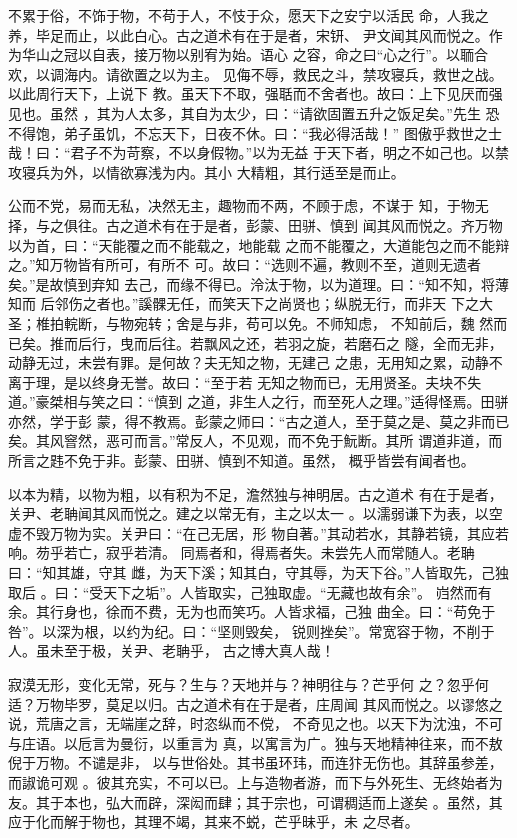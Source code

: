 \documentclass[]{article}
\begin{document}
不累于俗，不饰于物，不苟于人，不忮于众，愿天下之安宁以活民
命，人我之养，毕足而止，以此白心。古之道术有在于是者，宋钘、
尹文闻其风而悦之。作为华山之冠以自表，接万物以别宥为始。语心
之容，命之曰``心之行''。以聏合欢，以调海内。请欲置之以为主。
见侮不辱，救民之斗，禁攻寝兵，救世之战。以此周行天下，上说下
教。虽天下不取，强聒而不舍者也。故曰：上下见厌而强见也。虽然
，其为人太多，其自为太少，曰：``请欲固置五升之饭足矣。''先生
恐不得饱，弟子虽饥，不忘天下，日夜不休。曰：``我必得活哉！''
图傲乎救世之士哉！曰：``君子不为苛察，不以身假物。''以为无益
于天下者，明之不如己也。以禁攻寝兵为外，以情欲寡浅为内。其小
大精粗，其行适至是而止。

公而不党，易而无私，决然无主，趣物而不两，不顾于虑，不谋于
知，于物无择，与之俱往。古之道术有在于是者，彭蒙、田骈、慎到
闻其风而悦之。齐万物以为首，曰：``天能覆之而不能载之，地能载
之而不能覆之，大道能包之而不能辩之。''知万物皆有所可，有所不
可。故曰：``选则不遍，教则不至，道则无遗者矣。''是故慎到弃知
去己，而缘不得已。泠汰于物，以为道理。曰：``知不知，将薄知而
后邻伤之者也。''謑髁无任，而笑天下之尚贤也；纵脱无行，而非天
下之大圣；椎拍輐断，与物宛转；舍是与非，苟可以免。不师知虑，
不知前后，魏
然而已矣。推而后行，曳而后往。若飘风之还，若羽之旋，若磨石之
隧，全而无非，动静无过，未尝有罪。是何故？夫无知之物，无建己
之患，无用知之累，动静不离于理，是以终身无誉。故曰：``至于若
无知之物而已，无用贤圣。夫块不失道。''豪桀相与笑之曰：``慎到
之道，非生人之行，而至死人之理。''适得怪焉。田骈亦然，学于彭
蒙，得不教焉。彭蒙之师曰：``古之道人，至于莫之是、莫之非而已
矣。其风窨然，恶可而言。''常反人，不见观，而不免于魭断。其所
谓道非道，而所言之韪不免于非。彭蒙、田骈、慎到不知道。虽然，
概乎皆尝有闻者也。

以本为精，以物为粗，以有积为不足，澹然独与神明居。古之道术
有在于是者，关尹、老聃闻其风而悦之。建之以常无有，主之以太一
。以濡弱谦下为表，以空虚不毁万物为实。关尹曰：``在己无居，形
物自著。''其动若水，其静若镜，其应若响。芴乎若亡，寂乎若清。
同焉者和，得焉者失。未尝先人而常随人。老聃曰：``知其雄，守其
雌，为天下溪；知其白，守其辱，为天下谷。''人皆取先，己独取后
。曰：``受天下之垢''。人皆取实，己独取虚。``无藏也故有余''。
岿然而有余。其行身也，徐而不费，无为也而笑巧。人皆求福，己独
曲全。曰：``苟免于咎''。以深为根，以约为纪。曰：``坚则毁矣，
锐则挫矣''。常宽容于物，不削于人。虽未至于极，关尹、老聃乎，
古之博大真人哉！

寂漠无形，变化无常，死与？生与？天地并与？神明往与？芒乎何
之？忽乎何适？万物毕罗，莫足以归。古之道术有在于是者，庄周闻
其风而悦之。以谬悠之说，荒唐之言，无端崖之辞，时恣纵而不傥，
不奇见之也。以天下为沈浊，不可与庄语。以卮言为曼衍，以重言为
真，以寓言为广。独与天地精神往来，而不敖倪于万物。不谴是非，
以与世俗处。其书虽环玮，而连犿无伤也。其辞虽参差，而諔诡可观
。彼其充实，不可以已。上与造物者游，而下与外死生、无终始者为
友。其于本也，弘大而辟，深闳而肆；其于宗也，可谓稠适而上遂矣
。虽然，其应于化而解于物也，其理不竭，其来不蜕，芒乎昧乎，未 之尽者。
\end{document}
